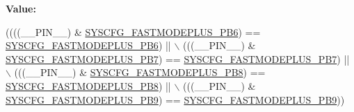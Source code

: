 {\bfseries Value\+:}
\begin{DoxyCode}
((((\_\_PIN\_\_) & \hyperlink{group___s_y_s_c_f_g___fast_mode_plus___g_p_i_o_ga1f9beaf68b00ae5598cb8d930da05704}{SYSCFG\_FASTMODEPLUS\_PB6})  == 
      \hyperlink{group___s_y_s_c_f_g___fast_mode_plus___g_p_i_o_ga1f9beaf68b00ae5598cb8d930da05704}{SYSCFG\_FASTMODEPLUS\_PB6})  || \(\backslash\)
                                         (((\_\_PIN\_\_) & \hyperlink{group___s_y_s_c_f_g___fast_mode_plus___g_p_i_o_ga4b939ef5ec69e81277ef2323d5917eb5}{SYSCFG\_FASTMODEPLUS\_PB7})  == 
      \hyperlink{group___s_y_s_c_f_g___fast_mode_plus___g_p_i_o_ga4b939ef5ec69e81277ef2323d5917eb5}{SYSCFG\_FASTMODEPLUS\_PB7})  || \(\backslash\)
                                         (((\_\_PIN\_\_) & \hyperlink{group___s_y_s_c_f_g___fast_mode_plus___g_p_i_o_ga2cd8442a02f25ed8e7e0ba6e5723edd4}{SYSCFG\_FASTMODEPLUS\_PB8})  == 
      \hyperlink{group___s_y_s_c_f_g___fast_mode_plus___g_p_i_o_ga2cd8442a02f25ed8e7e0ba6e5723edd4}{SYSCFG\_FASTMODEPLUS\_PB8})  || \(\backslash\)
                                         (((\_\_PIN\_\_) & \hyperlink{group___s_y_s_c_f_g___fast_mode_plus___g_p_i_o_ga71c50ae2406cd9b6dff73cd9cd189c3d}{SYSCFG\_FASTMODEPLUS\_PB9})  == 
      \hyperlink{group___s_y_s_c_f_g___fast_mode_plus___g_p_i_o_ga71c50ae2406cd9b6dff73cd9cd189c3d}{SYSCFG\_FASTMODEPLUS\_PB9}))
\end{DoxyCode}
